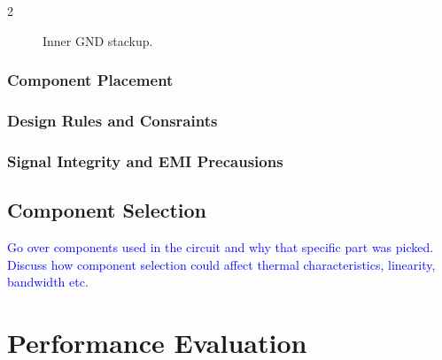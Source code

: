 \documentclass[10pt]{article}
\begin{document}
\begin{multicols*}{2}
\begin{figure*}[ht]
\begin{subfigure}[b]{0.3333\linewidth}
                            \caption{{Inner GND stackup.}}
                        \end{subfigure}\hfill
                        \label{fig:pcb-stackup}
                    \end{figure*}

                \subsubsection{Component Placement}

                \subsubsection{Design Rules and Consraints}

                \subsubsection{Signal Integrity and EMI Precausions}

            \subsection{Component Selection}
                \textcolor{blue}{Go over components used in the circuit and why that specific part was picked. Discuss how component selection could affect thermal characteristics, linearity, bandwidth etc.}
        
        \section{Performance Evaluation}


\end{multicols*}
\end{document}
